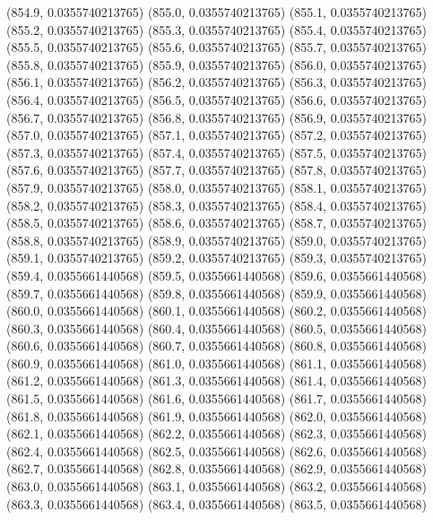 {					(854.9, 0.0355740213765)
					(855.0, 0.0355740213765)
					(855.1, 0.0355740213765)
					(855.2, 0.0355740213765)
					(855.3, 0.0355740213765)
					(855.4, 0.0355740213765)
					(855.5, 0.0355740213765)
					(855.6, 0.0355740213765)
					(855.7, 0.0355740213765)
					(855.8, 0.0355740213765)
					(855.9, 0.0355740213765)
					(856.0, 0.0355740213765)
					(856.1, 0.0355740213765)
					(856.2, 0.0355740213765)
					(856.3, 0.0355740213765)
					(856.4, 0.0355740213765)
					(856.5, 0.0355740213765)
					(856.6, 0.0355740213765)
					(856.7, 0.0355740213765)
					(856.8, 0.0355740213765)
					(856.9, 0.0355740213765)
					(857.0, 0.0355740213765)
					(857.1, 0.0355740213765)
					(857.2, 0.0355740213765)
					(857.3, 0.0355740213765)
					(857.4, 0.0355740213765)
					(857.5, 0.0355740213765)
					(857.6, 0.0355740213765)
					(857.7, 0.0355740213765)
					(857.8, 0.0355740213765)
					(857.9, 0.0355740213765)
					(858.0, 0.0355740213765)
					(858.1, 0.0355740213765)
					(858.2, 0.0355740213765)
					(858.3, 0.0355740213765)
					(858.4, 0.0355740213765)
					(858.5, 0.0355740213765)
					(858.6, 0.0355740213765)
					(858.7, 0.0355740213765)
					(858.8, 0.0355740213765)
					(858.9, 0.0355740213765)
					(859.0, 0.0355740213765)
					(859.1, 0.0355740213765)
					(859.2, 0.0355740213765)
					(859.3, 0.0355740213765)
					(859.4, 0.0355661440568)
					(859.5, 0.0355661440568)
					(859.6, 0.0355661440568)
					(859.7, 0.0355661440568)
					(859.8, 0.0355661440568)
					(859.9, 0.0355661440568)
					(860.0, 0.0355661440568)
					(860.1, 0.0355661440568)
					(860.2, 0.0355661440568)
					(860.3, 0.0355661440568)
					(860.4, 0.0355661440568)
					(860.5, 0.0355661440568)
					(860.6, 0.0355661440568)
					(860.7, 0.0355661440568)
					(860.8, 0.0355661440568)
					(860.9, 0.0355661440568)
					(861.0, 0.0355661440568)
					(861.1, 0.0355661440568)
					(861.2, 0.0355661440568)
					(861.3, 0.0355661440568)
					(861.4, 0.0355661440568)
					(861.5, 0.0355661440568)
					(861.6, 0.0355661440568)
					(861.7, 0.0355661440568)
					(861.8, 0.0355661440568)
					(861.9, 0.0355661440568)
					(862.0, 0.0355661440568)
					(862.1, 0.0355661440568)
					(862.2, 0.0355661440568)
					(862.3, 0.0355661440568)
					(862.4, 0.0355661440568)
					(862.5, 0.0355661440568)
					(862.6, 0.0355661440568)
					(862.7, 0.0355661440568)
					(862.8, 0.0355661440568)
					(862.9, 0.0355661440568)
					(863.0, 0.0355661440568)
					(863.1, 0.0355661440568)
					(863.2, 0.0355661440568)
					(863.3, 0.0355661440568)
					(863.4, 0.0355661440568)
					(863.5, 0.0355661440568)
}
